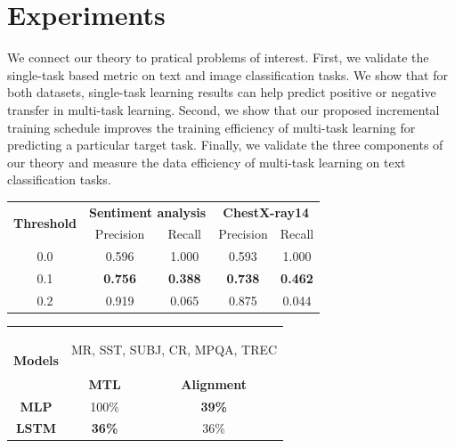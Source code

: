 \section{Experiments}

We connect our theory to pratical problems of interest.
First, we validate the single-task based metric on text and image classification tasks.
We show that for both datasets, single-task learning results can help predict positive or negative transfer in multi-task learning.
Second, we show that our proposed incremental training schedule improves the training efficiency of multi-task learning for predicting a particular target task.
Finally, we validate the three components of our theory and measure the data efficiency of multi-task learning on text classification tasks.

\begin{table}
\begin{minipage}[t]{.58\textwidth}
	\centering
  \begin{tabular}{c c c c c}
	\toprule
		\multirow{2}{*}{{\bf Threshold}}  & \multicolumn{2}{c}{{\bf Sentiment
		analysis}} & \multicolumn{2}{c}{{\bf ChestX-ray14}} \\
		& Precision &  Recall & Precision &  Recall \\
		\cmidrule(lr){1-1} \cmidrule(lr){2-3} \cmidrule(lr){4-5}
		0.0 & 0.596 & 1.000 & 0.593 & 1.000 \\
		0.1 & \textbf{0.756} & \textbf{0.388} & \textbf{0.738} & \textbf{0.462} \\
		0.2 & 0.919 & 0.065 & 0.875 & 0.044 \\
	\bottomrule
	\end{tabular}
	\vspace{0.1in}
	\label{tab:mtl_better_than_stl}
\end{minipage}
\quad
\begin{minipage}[t]{.40\textwidth}
	\centering
	\begin{tabular}{c c c}
		\toprule
		\multirow{2}{*}{{\bf Models}} & \multicolumn{2}{c}{\begin{minipage}{1.1in}\begin{center}
		MR, SST, SUBJ, CR, MPQA, TREC\end{center}\end{minipage}} \\
		\cmidrule(lr){2-3}
		& {\bf MTL} & {\bf Alignment} \\
		\midrule
		{\bf MLP}  & 100\% & \textbf{39\%} \\
		{\bf LSTM} & \textbf{36\%} & 36\% \\
		\bottomrule
		\end{tabular}
	\vspace{0.1in}
	\label{tab:taskonomy}
\end{minipage}
\end{table}

